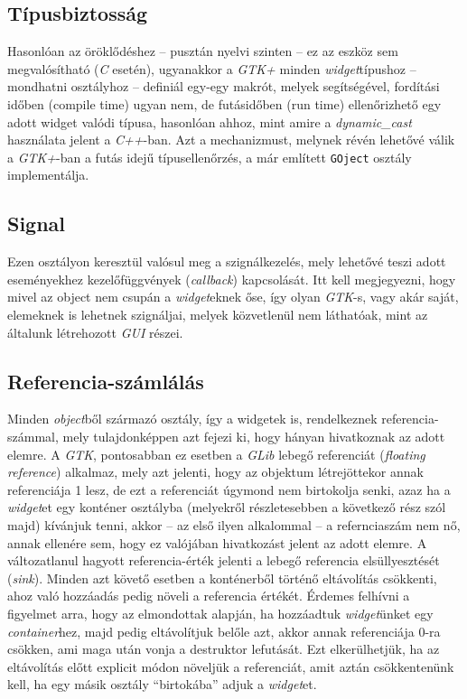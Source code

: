 \subsection{Típusbiztosság}

Hasonlóan az öröklődéshez -- pusztán nyelvi szinten -- ez az eszköz sem megvalósítható (\textit{C} esetén), ugyanakkor a \textit{GTK+} minden \textit{widget}típushoz -- mondhatni osztályhoz -- definiál egy-egy makrót, melyek segítségével, fordítási időben (compile time) ugyan nem, de futásidőben (run time) ellenőrizhető egy adott widget valódi típusa, hasonlóan ahhoz, mint amire a \textit{dynamic\_cast} használata jelent a \textit{C++}-ban. Azt a mechanizmust, melynek révén lehetővé válik a \textit{GTK+}-ban a futás idejű típusellenőrzés, a már említett \texttt{GOject} osztály implementálja.

\subsection{Signal}

Ezen osztályon keresztül valósul meg a szignálkezelés, mely lehetővé teszi adott eseményekhez kezelőfüggvények (\textit{callback}) kapcsolását. Itt kell megjegyezni, hogy mivel az object nem csupán a \textit{widget}eknek őse, így olyan \textit{GTK}-s, vagy akár saját, elemeknek is lehetnek szignáljai, melyek közvetlenül nem láthatóak, mint az általunk létrehozott \textit{GUI} részei.

\subsection{Referencia-számlálás}

Minden \textit{object}ből származó osztály, így a widgetek is, rendelkeznek referencia-számmal, mely tulajdonképpen azt fejezi ki, hogy hányan hivatkoznak az adott elemre. A \textit{GTK}, pontosabban ez esetben a \textit{GLib} lebegő referenciát (\textit{floating reference}) alkalmaz, mely azt jelenti, hogy az objektum létrejöttekor annak referenciája 1 lesz, de ezt a referenciát úgymond nem birtokolja senki, azaz ha a \textit{widget}et egy konténer osztályba (melyekről részletesebben a következő rész szól majd) kívánjuk tenni, akkor -- az első ilyen alkalommal -- a refernciaszám nem nő, annak ellenére sem, hogy ez valójában hivatkozást jelent az adott elemre. A változatlanul hagyott referencia-érték jelenti a lebegő referencia elsüllyesztését (\textit{sink}). Minden azt követő esetben a konténerből történő eltávolítás csökkenti, ahoz való hozzáadás pedig növeli a referencia értékét. Érdemes felhívni a figyelmet arra, hogy az elmondottak alapján, ha hozzáadtuk \textit{widget}ünket egy \textit{container}hez, majd pedig eltávolítjuk belőle azt, akkor annak referenciája 0-ra csökken, ami maga után vonja a destruktor lefutását. Ezt elkerülhetjük, ha az eltávolítás előtt explicit módon növeljük a referenciát, amit aztán csökkentenünk kell, ha egy másik osztály ``birtokába'' adjuk a \textit{widget}et.

